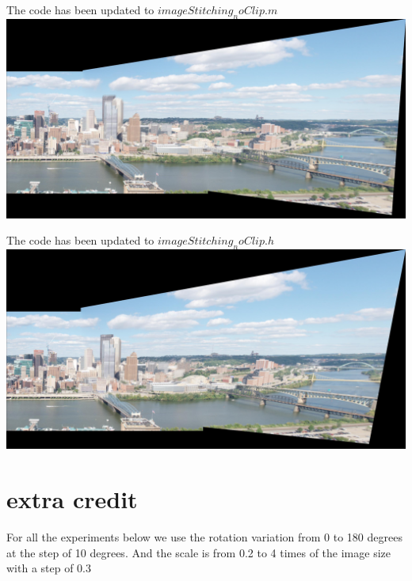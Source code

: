 \documentclass[12pt]{article}
\newenvironment{problem}[2][Problem]{\begin{trivlist}
\item[\hskip \labelsep {\bfseries #1}\hskip \labelsep {\bfseries #2.}]}{\end{trivlist}}
\begin{document}
\begin{problem}{6.2}
The code has been updated to $imageStitching_noClip.m$ \\

\includegraphics[scale=0.1]{results/q6_2_pan}\\
\end{problem}

\begin{problem}{6.3}
The code has been updated to $imageStitching_noClip.h$ \\
\includegraphics[scale=0.1]{results/q6_3}\\
\end{problem}
\newpage

\section{extra credit}

For all the experiments below we use the rotation variation from 0 to 180 degrees at the step of 10 degrees. And the scale is from 0.2 to 4 times of the image size with a step of 0.3
\end{document}

